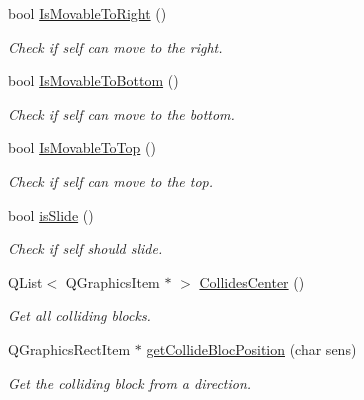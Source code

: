 \begin{DoxyCompactItemize}
bool \hyperlink{class_b___movable_a134b648413c6d27c008f8a0655ffa0f9}{Is\+Movable\+To\+Right} ()
\begin{DoxyCompactList}\small\item\em Check if self can move to the right. \end{DoxyCompactList}\item 
bool \hyperlink{class_b___movable_a190fdc076141ae6698334bfe4dfd61a3}{Is\+Movable\+To\+Bottom} ()
\begin{DoxyCompactList}\small\item\em Check if self can move to the bottom. \end{DoxyCompactList}\item 
bool \hyperlink{class_b___movable_a68bb6a98d031f9495cdeb80b9aa325c4}{Is\+Movable\+To\+Top} ()
\begin{DoxyCompactList}\small\item\em Check if self can move to the top. \end{DoxyCompactList}\item 
bool \hyperlink{class_b___movable_a44d1413ec8bceda3b1a50c673b429d03}{is\+Slide} ()
\begin{DoxyCompactList}\small\item\em Check if self should slide. \end{DoxyCompactList}\item 
Q\+List$<$ Q\+Graphics\+Item $\ast$ $>$ \hyperlink{class_b___movable_a081e4e71fb9483330f3315e6b32bbcbb}{Collides\+Center} ()
\begin{DoxyCompactList}\small\item\em Get all colliding blocks. \end{DoxyCompactList}\item 
Q\+Graphics\+Rect\+Item $\ast$ \hyperlink{class_b___movable_a4cb26e3d494505eaaa6773c0a448c479}{get\+Collide\+Bloc\+Position} (char sens)
\begin{DoxyCompactList}\small\item\em Get the colliding block from a direction. \end{DoxyCompactList}\end{DoxyCompactItemize}
